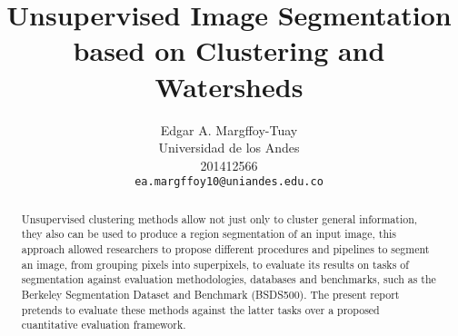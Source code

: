 \documentclass[10pt,twocolumn,letterpaper]{article}
\begin{document}
\title{Unsupervised Image Segmentation based on Clustering and Watersheds}

\author{Edgar A. Margffoy-Tuay\\
Universidad de los Andes\\
201412566\\
{\tt\small ea.margffoy10@uniandes.edu.co}
}

\maketitle

\begin{abstract}
Unsupervised clustering methods allow not just only to cluster general information, they also can be used to produce a region segmentation of an input image, this approach allowed researchers to propose different procedures and pipelines to segment an image, from grouping pixels into superpixels, to evaluate its results on tasks of segmentation against evaluation methodologies, databases and benchmarks, such as the Berkeley Segmentation Dataset and Benchmark (BSDS500). The present report pretends to evaluate these methods against the latter tasks over a proposed cuantitative evaluation framework.
\end{abstract}


\end{document}
